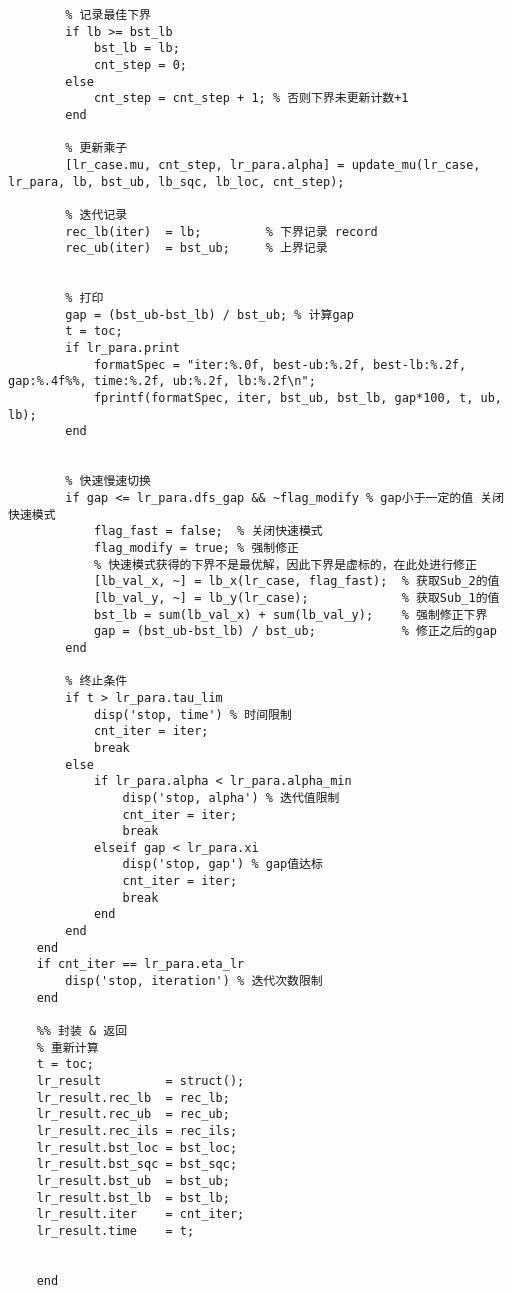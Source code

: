 {\begin{lstlisting}
        % 记录最佳下界
        if lb >= bst_lb
            bst_lb = lb;
            cnt_step = 0;
        else
            cnt_step = cnt_step + 1; % 否则下界未更新计数+1
        end

        % 更新乘子
        [lr_case.mu, cnt_step, lr_para.alpha] = update_mu(lr_case, lr_para, lb, bst_ub, lb_sqc, lb_loc, cnt_step);

        % 迭代记录
        rec_lb(iter)  = lb;         % 下界记录 record
        rec_ub(iter)  = bst_ub;     % 上界记录
        

        % 打印
        gap = (bst_ub-bst_lb) / bst_ub; % 计算gap
        t = toc;
        if lr_para.print
            formatSpec = "iter:%.0f, best-ub:%.2f, best-lb:%.2f, gap:%.4f%%, time:%.2f, ub:%.2f, lb:%.2f\n";
            fprintf(formatSpec, iter, bst_ub, bst_lb, gap*100, t, ub, lb);
        end
        

        % 快速慢速切换
        if gap <= lr_para.dfs_gap && ~flag_modify % gap小于一定的值 关闭快速模式
            flag_fast = false;  % 关闭快速模式
            flag_modify = true; % 强制修正
            % 快速模式获得的下界不是最优解，因此下界是虚标的，在此处进行修正
            [lb_val_x, ~] = lb_x(lr_case, flag_fast);  % 获取Sub_2的值
            [lb_val_y, ~] = lb_y(lr_case);             % 获取Sub_1的值
            bst_lb = sum(lb_val_x) + sum(lb_val_y);    % 强制修正下界
            gap = (bst_ub-bst_lb) / bst_ub;            % 修正之后的gap
        end

        % 终止条件
        if t > lr_para.tau_lim
            disp('stop, time') % 时间限制
            cnt_iter = iter;
            break
        else
            if lr_para.alpha < lr_para.alpha_min
                disp('stop, alpha') % 迭代值限制
                cnt_iter = iter;
                break
            elseif gap < lr_para.xi
                disp('stop, gap') % gap值达标
                cnt_iter = iter;
                break
            end
        end
    end
    if cnt_iter == lr_para.eta_lr
        disp('stop, iteration') % 迭代次数限制
    end

    %% 封装 & 返回      
    % 重新计算
    t = toc;
    lr_result         = struct();
    lr_result.rec_lb  = rec_lb;
    lr_result.rec_ub  = rec_ub;
    lr_result.rec_ils = rec_ils;
    lr_result.bst_loc = bst_loc;
    lr_result.bst_sqc = bst_sqc;
    lr_result.bst_ub  = bst_ub;
    lr_result.bst_lb  = bst_lb;
    lr_result.iter    = cnt_iter;
    lr_result.time    = t;


    end


\end{lstlisting}}
